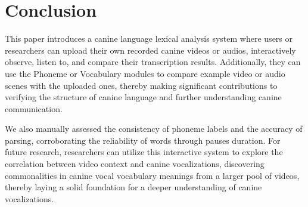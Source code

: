 \section{Conclusion}

This paper introduces a canine language lexical analysis system  where users or researchers can upload their own recorded canine videos or audios, interactively observe, listen to, and compare their transcription results. Additionally, they can use the Phoneme or Vocabulary modules to compare example video or audio scenes with the uploaded ones, thereby making significant contributions to verifying the structure of canine language and further understanding canine communication.

We also manually assessed the consistency of phoneme labels and the accuracy of parsing, corroborating the reliability of words through pauses duration. 
For future research, researchers can utilize this interactive system to explore the correlation between video context and canine vocalizations, discovering commonalities in canine vocal vocabulary meanings from a larger pool of videos, thereby laying a solid foundation for a deeper understanding of canine vocalizations.
